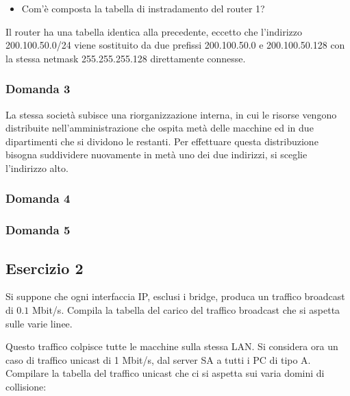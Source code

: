 \documentclass{article}
\numberwithin{equation}{subsection}
\begin{document}
\begin{itemize}
    \item Com'è composta la tabella di instradamento del router 1?
\end{itemize}

Il router ha una tabella identica alla precedente, eccetto che l'indirizzo 200.100.50.0/24 viene sostituito da due prefissi 200.100.50.0 e 
200.100.50.128 con la stessa netmask 255.255.255.128 direttamente connesse. 

\subsubsection*{Domanda 3}

La stessa società subisce una riorganizzazione interna, in cui le risorse vengono distribuite nell'amministrazione che ospita metà delle 
macchine ed in due dipartimenti che si dividono le restanti. Per effettuare questa distribuzione bisogna suddividere nuovamente in metà  
uno dei due indirizzi, si sceglie l'indirizzo alto. 


\subsubsection*{Domanda 4}

\subsubsection*{Domanda 5}


\subsection*{Esercizio 2}



Si suppone che ogni interfaccia IP, esclusi i bridge, produca un traffico broadcast di $0.1$ Mbit/s. Compila la tabella del carico del traffico broadcast che 
si aspetta sulle varie linee. 


Questo traffico colpisce tutte le macchine sulla stessa LAN. Si considera ora un caso di traffico unicast di 1 Mbit/s, dal server SA a 
tutti i PC di tipo A. Compilare la tabella del traffico unicast che ci si aspetta sui varia domini di collisione:
\end{document}
